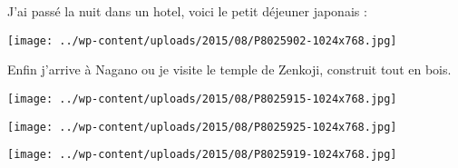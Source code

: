  \newline
 J'ai passé la nuit dans un hotel, voici le petit déjeuner japonais : \newline
 \newline
\centerline{\texttt{[image: ../wp-content/uploads/2015/08/P8025902-1024x768.jpg]} } 
 \newline
 Enfin j'arrive à Nagano ou je visite le temple de Zenkoji, construit tout en bois. \newline
 \newline
\centerline{\texttt{[image: ../wp-content/uploads/2015/08/P8025915-1024x768.jpg]} } 
 \newline
 \newline
\centerline{\texttt{[image: ../wp-content/uploads/2015/08/P8025925-1024x768.jpg]} } 
 \newline
 \newline
\centerline{\texttt{[image: ../wp-content/uploads/2015/08/P8025919-1024x768.jpg]} } 
 \newline

\newpage
 
